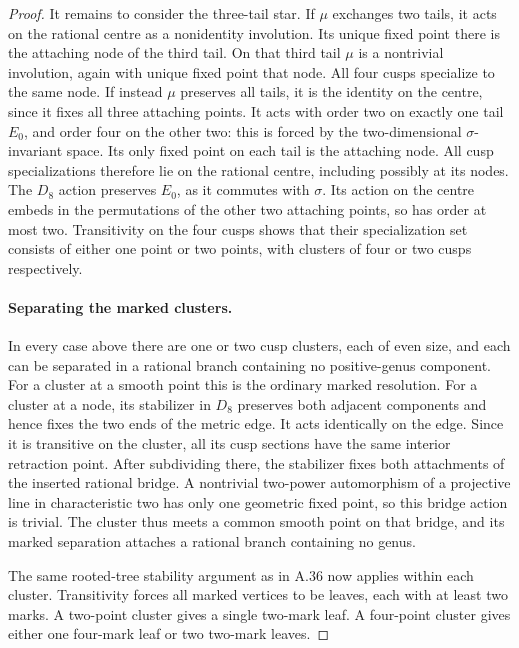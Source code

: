 \begin{proof}
It remains to consider the three-tail star. If \(\mu\)
exchanges two tails, it acts on the rational centre as
a nonidentity involution. Its unique fixed point there
is the attaching node of the third tail. On that third
tail \(\mu\) is a nontrivial involution, again with
unique fixed point that node. All four cusps specialize
to the same node. If instead \(\mu\) preserves all
tails, it is the identity on the centre, since it fixes
all three attaching points. It acts with order two
on exactly one tail \(E_0\), and order four on the
other two: this is forced by the two-dimensional
\(\sigma\)-invariant space. Its only fixed point on
each tail is the attaching node. All cusp specializations
therefore lie on the rational centre, including possibly
at its nodes. The \(D_8\) action preserves \(E_0\), as
it commutes with \(\sigma\). Its action on the centre
embeds in the permutations of the other two attaching
points, so has order at most two. Transitivity on the
four cusps shows that their specialization set consists
of either one point or two points, with clusters of
four or two cusps respectively.

\paragraph{Separating the marked clusters.}
In every case above there are one or two cusp clusters,
each of even size, and each can be separated in a
rational branch containing no positive-genus component.
For a cluster at a smooth point this is the ordinary
marked resolution. For a cluster at a node, its
stabilizer in \(D_8\) preserves both adjacent components
and hence fixes the two ends of the metric edge.
It acts identically on the edge. Since it is transitive
on the cluster, all its cusp sections have the same
interior retraction point. After subdividing there,
the stabilizer fixes both attachments of the inserted
rational bridge. A nontrivial two-power automorphism
of a projective line in characteristic two has only
one geometric fixed point, so this bridge action is
trivial. The cluster thus meets a common smooth point
on that bridge, and its marked separation attaches a
rational branch containing no genus.

The same rooted-tree stability argument as in A.36
now applies within each cluster. Transitivity forces
all marked vertices to be leaves, each with at least
two marks. A two-point cluster gives a single two-mark
leaf. A four-point cluster gives either one four-mark
leaf or two two-mark leaves.


\end{proof}
